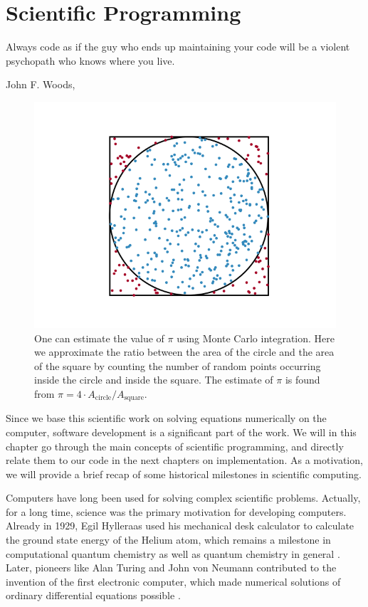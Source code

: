 \chapter{Scientific Programming} \label{chp:scientificprogramming}
\epigraph{Always code as if the guy who ends up maintaining your code will be a violent psychopath who knows where you live.}{John F. Woods, \cite{woods_usage_nodate}}
\begin{figure}[H]
	\centering
	\includegraphics[scale=0.7]{Images/montecarlointegration2.png}
	\caption{One can estimate the value of $\pi$ using Monte Carlo integration. Here we approximate the ratio between the area of the circle and the area of the square by counting the number of random points occurring inside the circle and inside the square. The estimate of $\pi$ is found from $\pi=4\cdot A_{\text{circle}}/A_{\text{square}}$.}
	\label{fig:montecarlointegration}
\end{figure}

Since we base this scientific work on solving equations numerically on the computer, software development is a significant part of the work. We will in this chapter go through the main concepts of scientific programming, and directly relate them to our code in the next chapters on implementation. As a motivation, we will provide a brief recap of some historical milestones in scientific computing.

Computers have long been used for solving complex scientific problems. Actually, for a long time, science was the primary motivation for developing computers. Already in 1929, Egil Hylleraas used his mechanical desk calculator to calculate the ground state energy of the Helium atom, which remains a milestone in computational quantum chemistry as well as quantum chemistry in general \cite{helgaker_perspective_2000}. Later, pioneers like Alan Turing and John von Neumann contributed to the invention of the first electronic computer, which made numerical solutions of ordinary differential equations possible \cite{gustafsson_scientific_2018}. 

